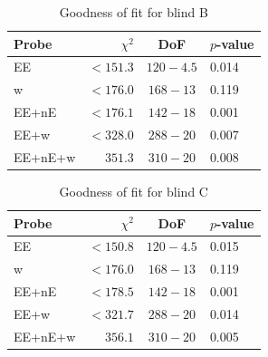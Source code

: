 \begin{table}
	\begin{center}
		\caption{Goodness of fit for blind B}
		\label{tab:goodness-of-fit}
\begin{tabular}{lrcl}
    \toprule
    Probe             & $\chi^2$       & DoF       & $p$-value   \\
    \midrule
	EE               & $< 151.3$ & $120-4.5$ & 0.014 \\
	w                & $< 176.0$ & $168-13$ & 0.119 \\
	EE+nE            & $< 176.1$ & $142-18$ & 0.001 \\
	EE+w             & $< 328.0$ & $288-20$ & 0.007 \\
	EE+nE+w          & $351.3$ & $310-20$ & 0.008 \\
	
    \bottomrule
\end{tabular}
	\end{center}
\end{table}

\begin{table}
	\begin{center}
		\caption{Goodness of fit for blind C}
		\label{tab:goodness-of-fit}
\begin{tabular}{lrcl}
    \toprule
    Probe             & $\chi^2$       & DoF       & $p$-value   \\
    \midrule
	EE               & $< 150.8$ & $120-4.5$ & 0.015 \\
	w                & $< 176.0$ & $168-13$ & 0.119 \\
	EE+nE            & $< 178.5$ & $142-18$ & 0.001 \\
	EE+w             & $< 321.7$ & $288-20$ & 0.014 \\
	EE+nE+w          & $356.1$ & $310-20$ & 0.005 \\

    \bottomrule
\end{tabular}
	\end{center}
\end{table}
